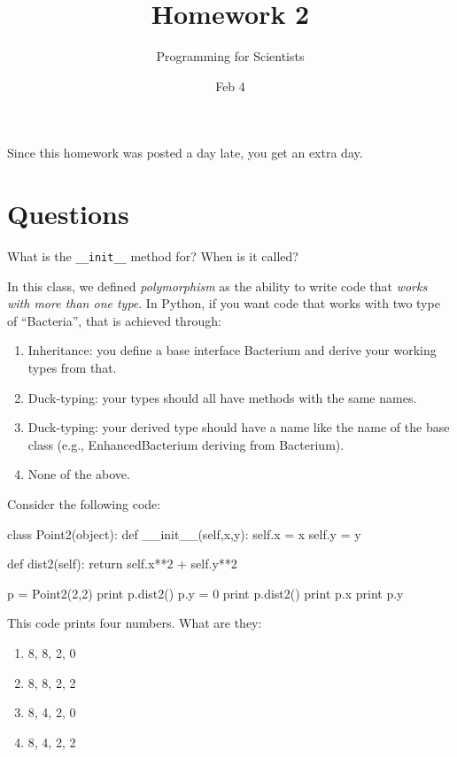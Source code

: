 
\author{Programming for Scientists}
\title{Homework 2}
\date{Feb 4}

\maketitle

Since this homework was posted a day late, you get an extra day.

\chapter{Questions}

\question
What is the \lstinline{__init__} method for? When is it called?

\question
In this class, we defined \textit{polymorphism} as the ability to write code that \emph{works with more than one type}. In Python, if you want code that works with two type of ``Bacteria'', that is achieved through:

\begin{enumerate}[a]
\item Inheritance: you define a base interface Bacterium and derive your working types from that.
\item Duck-typing: your types should all have methods with the same names.
\item Duck-typing: your derived type should have a name like the name of the base class (e.g., EnhancedBacterium deriving from Bacterium).
\item None of the above.
\end{enumerate}

\question
Consider the following code:

\begin{python}
class Point2(object):
    def __init__(self,x,y):
        self.x = x
        self.y = y

    def dist2(self):
        return self.x**2 + self.y**2 

p = Point2(2,2)
print p.dist2()
p.y = 0
print p.dist2()
print p.x
print p.y
\end{python}

This code prints four numbers. What are they:

\begin{enumerate}[a]
\item 8, 8, 2, 0
\item 8, 8, 2, 2
\item 8, 4, 2, 0
\item 8, 4, 2, 2
\end{enumerate}

